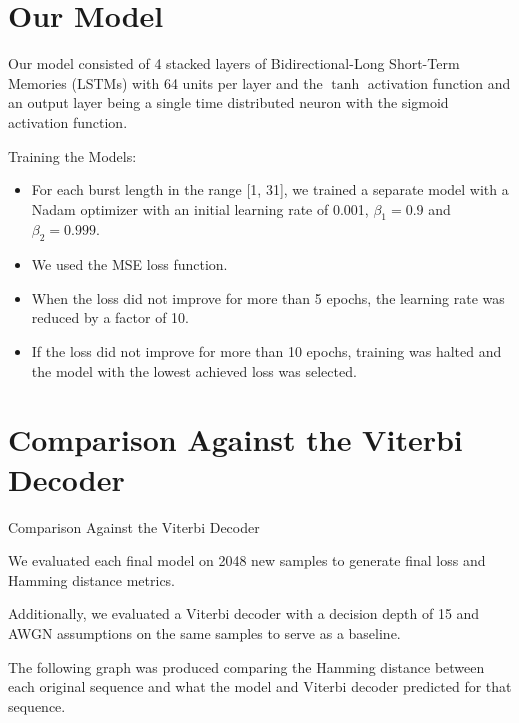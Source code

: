 \documentclass{beamer}
\newcommand{\<}				{\langle}
\renewcommand{\>}      		{\rangle}
\begin{document}
\section{Our Model} 

\begin{frame}


Our model consisted of 4 stacked layers of Bidirectional-Long Short-Term Memories (LSTMs) with 64 units per layer and the $\tanh$ activation function and an output layer being a single time distributed neuron with the sigmoid activation function. 

\smallskip

Training the Models:

\begin{itemize}
\item For each burst length in the range [1, 31], we trained a separate model with a Nadam optimizer with an initial learning rate of 0.001, $\beta_1=0.9$ and $\beta_2=0.999$.

\item We used the MSE loss function.

\item When the loss did not improve for more than 5 epochs, the learning rate was reduced by a factor of 10.

\item If the loss did not improve for more than 10 epochs, training was halted and the model with the lowest achieved loss was selected. 

\end{itemize}

\end{frame}

\section{Comparison Against the Viterbi Decoder} 

\begin{frame}{Comparison Against the Viterbi Decoder}

We evaluated each final model on 2048 new samples to generate final loss and Hamming distance metrics. 

\medskip

Additionally, we evaluated a Viterbi decoder with a decision depth of 15 and AWGN assumptions on the same samples to serve as a baseline.

\medskip

The following graph was produced comparing the Hamming distance between each original sequence and what the model and Viterbi decoder predicted for that sequence.
\end{frame}
\end{document}
